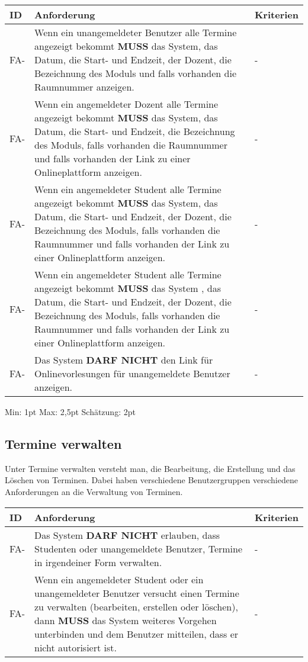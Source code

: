 \begin{tabular} {|p{}|p{11cm}|p{}|}
	\hline
	ID & Anforderung & Kriterien \\
	\hline
	FA-
	& Wenn ein unangemeldeter Benutzer alle Termine angezeigt bekommt \textbf{MUSS} das System, das Datum, die Start- und Endzeit, der Dozent, die Bezeichnung des Moduls und falls vorhanden die Raumnummer anzeigen. 
	& - \\
	\hline
	FA-
	& Wenn ein angemeldeter Dozent alle Termine angezeigt bekommt \textbf{MUSS} das System, das Datum, die Start- und Endzeit, die Bezeichnung des Moduls, falls vorhanden die Raumnummer und falls vorhanden der Link zu einer Onlineplattform anzeigen. 
	& - \\
	\hline
	FA-
	& Wenn ein angemeldeter Student alle Termine angezeigt bekommt \textbf{MUSS} das System, das Datum, die Start- und Endzeit, der Dozent, die Bezeichnung des Moduls, falls vorhanden die Raumnummer und falls vorhanden der Link zu einer Onlineplattform anzeigen. 
	& - \\
	\hline
	FA-
	& Wenn ein angemeldeter Student alle Termine angezeigt bekommt \textbf{MUSS} das System , das Datum, die Start- und Endzeit, der Dozent, die Bezeichnung des Moduls, falls vorhanden die Raumnummer und falls vorhanden der Link zu einer Onlineplattform anzeigen.
	& - \\
	\hline
	FA-
	& Das System \textbf{DARF NICHT} den Link für Onlinevorlesungen für unangemeldete Benutzer anzeigen. 
	& - \\
	\hline
\end{tabular}
Min: 1pt
Max: 2,5pt
Schätzung: 2pt

\newpage

\subsection{Termine verwalten}
Unter Termine verwalten versteht man, die Bearbeitung, die Erstellung und das Löschen von Terminen. Dabei haben verschiedene Benutzergruppen verschiedene Anforderungen an die Verwaltung von Terminen.

\begin{tabular} {|p{}|p{11cm}|p{}|}
	\hline
	ID & Anforderung & Kriterien \\
	\hline
	FA-
	& Das System \textbf{DARF NICHT} erlauben, dass Studenten oder unangemeldete Benutzer, Termine in irgendeiner Form verwalten. 
	& - \\
	\hline
	FA-
	& Wenn ein angemeldeter Student oder ein unangemeldeter Benutzer versucht einen Termine zu verwalten (bearbeiten, erstellen oder löschen), dann \textbf{MUSS} das System weiteres Vorgehen unterbinden und dem Benutzer mitteilen, dass er nicht autorisiert ist.
	& - \\ 
	\hline
\end{tabular}

